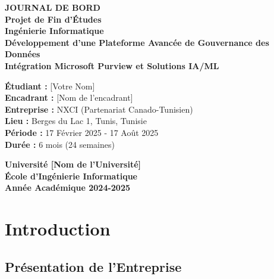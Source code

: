 \documentclass[12pt,a4paper]{article}
\begin{document}
\begin{titlepage}
\centering
\vspace*{2cm}

{\Huge\bfseries JOURNAL DE BORD}\\[0.5cm]
{\Large\bfseries Projet de Fin d'Études}\\[0.3cm]
{\large\bfseries Ingénierie Informatique}\\[2cm]

{\large\bfseries\color{primaryblue}Développement d'une Plateforme Avancée de Gouvernance des Données}\\[0.5cm]
{\large\bfseries\color{secondaryblue}Intégration Microsoft Purview et Solutions IA/ML}\\[2cm]

\begin{minipage}{0.8\textwidth}
\centering
\textbf{Étudiant :} [Votre Nom]\\[0.3cm]
\textbf{Encadrant :} [Nom de l'encadrant]\\[0.3cm]
\textbf{Entreprise :} NXCI (Partenariat Canado-Tunisien)\\[0.3cm]
\textbf{Lieu :} Berges du Lac 1, Tunis, Tunisie\\[0.3cm]
\textbf{Période :} 17 Février 2025 - 17 Août 2025\\[0.3cm]
\textbf{Durée :} 6 mois (24 semaines)
\end{minipage}

\vfill

{\large\bfseries\color{accentgreen}Université [Nom de l'Université]}\\[0.3cm]
{\large\bfseries\color{accentgreen}École d'Ingénierie Informatique}\\[0.3cm]
{\large\bfseries\color{accentgreen}Année Académique 2024-2025}

\vspace{2cm}

\end{titlepage}

\tableofcontents
\newpage

\section{Introduction}

\subsection{Présentation de l'Entreprise}
\end{document}
